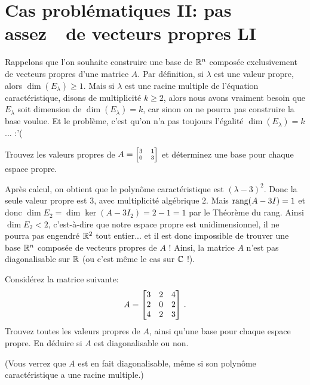 

\section{Cas problématiques II: pas \og assez\ \fg\ de vecteurs propres LI}

Rappelons que l'on souhaite construire une base de $\mathbb{R}^n$ composée exclusivement de vecteurs propres d'une matrice $A$. Par définition, si $\lambda$ est une valeur propre, alors $\dim(E_\lambda) \geq 1$. 
Mais si $\lambda$ est une racine multiple de l'équation caractéristique,
disons de multiplicité $k\geq 2$, alors nous avons vraiment besoin que $E_\lambda$ soit dimension de $\dim(E_\lambda) = k$, car sinon on ne pourra pas construire la base voulue. Et le problème, c'est qu'on n'a pas toujours l'égalité $\dim(E_\lambda) = k$... :'(

\begin{myprob} Trouvez les valeurs propres de $A = \scriptsize\left[ \begin{matrix} 3 & 1\\ 0 & 3 \end{matrix} \right]$ et déterminez une
base pour chaque espace propre.

\begin{mysol} Après calcul, on obtient que le polynôme caractéristique est $(\lambda -3)^2$. Donc
la seule valeur propre est $3$, avec multiplicité algébrique $2$.
Mais  $\textrm{rang}(A- 3I) = 1$ et donc $\dim E_2 = \dim \ker(A- 3I_2) = 2-1=1$ par le Théorème du rang. Ainsi $\dim E_2 < 2$, c'est-à-dire que notre espace propre est unidimensionnel, il ne pourra pas engendré $\mathbb{R}^2$ tout entier...
et il est donc impossible de trouver une base $\mathbb{R}^n$ compos\'ee de vecteurs propres de $A$ !
Ainsi, la matrice $A$ n'est pas diagonalisable sur $\mathbb{R}$ (ou c'est même le cas sur $\mathbb{C}$ !).
\end{mysol}\end{myprob}


\begin{myprob} Consid\'erez la matrice suivante:
$$
A = \left[ \begin{matrix} 3 & 2 & 4\\ 2& 0 & 2\\ 4 & 2 & 3 \end{matrix} \right]\,.
$$
Trouvez toutes les valeurs propres de $A$, ainsi qu'une base pour chaque espace propre. En déduire
si $A$ est diagonalisable ou non. 

(Vous verrez que $A$ est en fait diagonalisable, même si son polynôme caractéristique a une racine multiple.)
\end{myprob}

